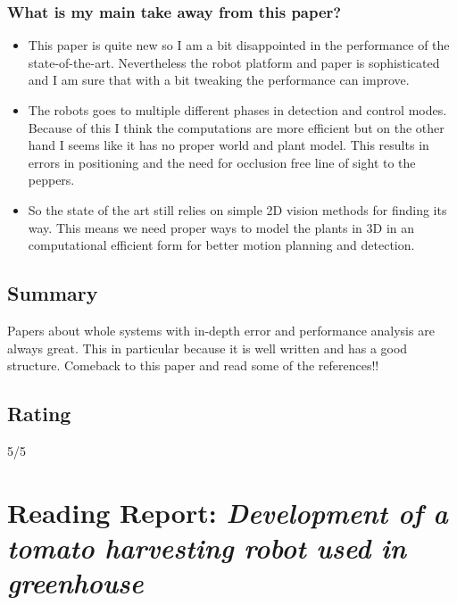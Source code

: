     \subsubsection*{What is my main take away from this paper?}
    \begin{itemize}
        \item This paper is quite new so I am a bit disappointed in the performance of the state-of-the-art.
        Nevertheless the robot platform and paper is sophisticated and I am sure that with a bit tweaking the performance can improve.
        \item The robots goes to multiple different phases in detection and control modes. Because of this I think the 
        computations are more efficient but on the other hand I seems like it has no proper world and plant model. 
        This results in errors in positioning and the need for occlusion free line of sight to the peppers. 
        \item So the state of the art still relies on simple 2D vision methods for finding its way.  
        This means we need proper ways to model the plants in 3D in an computational efficient form for better motion planning and detection.
    \end{itemize}
    
    \subsection*{Summary}
    Papers about whole systems with in-depth error and performance analysis are always great. This in particular because it is well written and has a good structure. 
    Comeback to this paper and read some of the references!!
    
    \subsection*{Rating}
    5/5
    
    \newpage
    \section{Reading Report: \emph{Development of a tomato harvesting robot used in greenhouse}}
    \cite{Lili2017}
    
